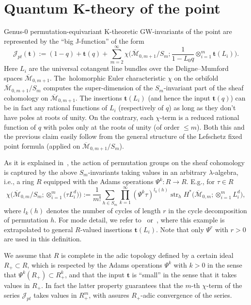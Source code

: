 \documentclass[11pt]{article}
\numberwithin{equation}{section}
\numberwithin{equation}{section}
\def\J{\mathcal J}
\def\M{{\overline{\mathcal M}}}
\def\t{{\mathbf t}}
\def\str{\operatorname{str}}
\def\str{\operatorname{str}}
\begin{document}
\section{Quantum K-theory of the point}
\label{Sec3}

Genus-0 permutation-equivariant K-theoretic GW-invariants of the point are represented by the ``big J-function'' of the form
\[
\J_{pt}(\t):=(1-q)+\t(q)+\sum_{m=2}^{\infty}\chi
\bigg(\M_{0,m+1}/S_m; \frac{1}{1-L_0q}\otimes_{i=1}^m \t(L_i)\bigg).
\]
Here $L_i$ are the universal cotangent line bundles over the Deligne--Mumford spaces $\M_{0,m+1}$. The~holomorphic Euler characteristic $\chi$ on the orbifold $\M_{0,m+1}/S_m$ computes the super-dimen\-sion of the $S_m$-invariant part of the sheaf cohomology on $\M_{0,m+1}$. The insertions $\t(L_i)$ (and hence the input $\t(q)$) can be in fact any rational functions of $L_i$ (respectively of $q$) as long as they don't have poles at roots of unity. On the contrary, each $\chi$-term is a reduced rational function of $q$ with poles only at the roots of unity (of order $\leq m$). Both this and the previous claim easily follow from the general structure of the Lefschetz fixed point formula (applied on $\M_{0,m+1}/S_m$).

As it is explained in~\cite{Givental:perm1, Givental:perm9}, the action of permutation groups on the sheaf cohomology is captured by the above $S_m$-invariants taking values in an arbitrary $\lambda$-algebra, i.e., a ring $R$ equipped with the Adams operations $\Psi^k\colon R\to R$. E.g., for $\tau\in R$
\[
\chi\big(\M_{0,m}/S_m;\otimes_{i=1}^m \big(\tau L_i^d\big)\big) := \frac{1}{m!} \sum_{h\in S_m}\prod_{k=1}^{\infty} (\Psi^k\tau)^{l_k(h)} \str_h H^*\big(\M_{0,m};\otimes_{i=1}^mL_i^d\big),
\]
where $l_k(h)$ denotes the number of cycles of length $r$ in the cycle decomposition of permutation $h$. For mode detail, we refer to~\cite{Givental:perm1} or~\cite{Givental:perm9}, where this example is
extrapolated to general $R$-valued insertions $\t(L_i)$. Note that only $\Psi^r$ with $r>0$ are used in this definition.

We assume that $R$ is complete in the adic topology defined by a certain ideal $R_{+}\subset R$, which is respected by the Adams operations $\Psi^k$ with $k>0$ in the sense that $\Psi^k(R_{+})\subset R_{+}^k$, and that the input $\t$ is ``small'' in the sense that it takes values in $R_{+}$. In fact the latter property guarantees that the $m$-th $\chi$-term of the series $\J_{pt}$ takes values in $R_{+}^m$, with assures $R_{+}$-adic convergence of the series.
\end{document}
